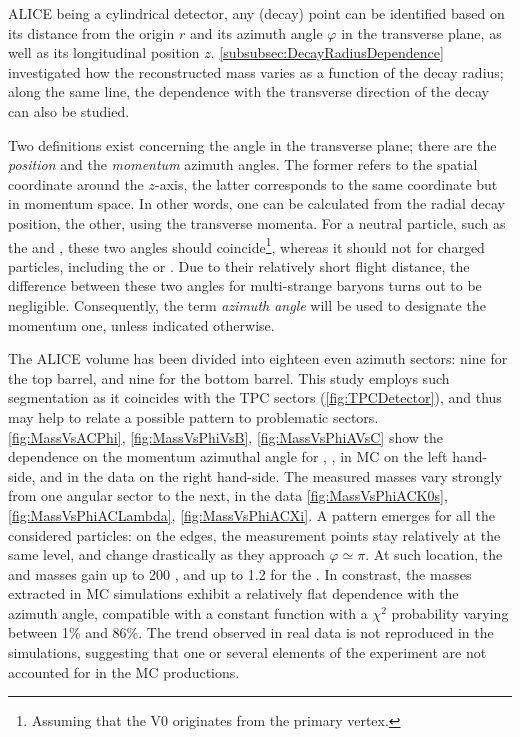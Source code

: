 ALICE being a cylindrical detector, any (decay) point can be identified based on its distance from the origin $r$ and its azimuth angle $\varphi$ in the transverse plane, as well as its longitudinal position $z$. \Sec\ref{subsubsec:DecayRadiusDependence} investigated how the reconstructed mass varies as a function of the decay radius; along the same line, the dependence with the transverse direction of the decay can also be studied.

Two definitions exist concerning the angle in the transverse plane; there are the \textit{position} and the \textit{momentum} azimuth angles. The former refers to the spatial coordinate around the $z$-axis, the latter corresponds to the same coordinate but in momentum space. In other words, one can be calculated from the radial decay position, the other, using the transverse momenta. For a neutral particle, such as the \rmKzeroS and \rmLambda, these two angles should coincide\footnote{Assuming that the V0 originates from the primary vertex.}, whereas it should not for charged particles, including the \rmXi or \rmOmega. Due to their relatively short flight distance, the difference between these two angles for multi-strange baryons turns out to be negligible. Consequently, the term \textit{azimuth angle} will be used to designate the momentum one, unless indicated otherwise.

The ALICE volume has been divided into eighteen even azimuth sectors: nine for the top barrel, and nine for the bottom barrel. This study employs such segmentation as it coincides with the TPC sectors (\fig\ref{fig:TPCDetector}), and thus may help to relate a possible pattern to problematic sectors.\\

\Figs\ref{fig:MassVsACPhi}, \ref{fig:MassVsPhiVsB}, \ref{fig:MassVsPhiAVsC} show the dependence on the momentum azimuthal angle for \rmKzeroS, \rmLambda, \rmXi in MC on the left hand-side, and in the data on the right hand-side. The measured masses vary strongly from one angular sector to the next, in the data \figs\ref{fig:MassVsPhiACK0s}, \ref{fig:MassVsPhiACLambda}, \ref{fig:MassVsPhiACXi}. A pattern emerges for all the considered particles: on the edges, the measurement points stay relatively at the same level, and change drastically as they approach $\varphi \simeq \pi$. At such location, the \rmLambda and \rmXi masses gain up to 200 \kmass, and up to 1.2 \mmass for the \rmKzeroS. In constrast, the masses extracted in MC simulations exhibit a relatively flat dependence with the azimuth angle, compatible with a constant function with a $\chi^{2}$ probability varying between 1\% and 86\%. The trend observed in real data is not reproduced in the simulations, suggesting that one or several elements of the experiment are not accounted for in the MC productions.

